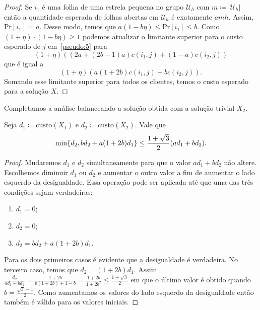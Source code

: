 \begin{proof}
    Se $i_1$ é uma folha de uma estrela pequena no grupo $\mathcal{U}_h$ com $m \coloneqq |\mathcal{U}_h|$ então a quantidade esperada de folhas abertas em $\mathcal{U}_h$ é exatamente $amh$. Assim, Pr$[i_1] = a$. Desse modo, temos que $a(1 - b\eta) \leq \text{Pr}[i_1] \leq b$. Como $(1+\eta)\cdot(1 - b\eta) \geq 1$ podemos atualizar o limitante superior para o custo esperado de $j$ em~\eqref{pseudo:5} para
    \begin{equation}
        (1 + \eta) ((2a + (2b - 1)a)c(i_1,j) + (1 - a) c(i_2,j)) \nonumber
    \end{equation}
    que é igual a 
    \begin{equation}
        (1 + \eta) (a (1 + 2b)c(i_1,j) + bc(i_2,j)) \nonumber.
    \end{equation}
    Somando esse limitante superior para todos os clientes, temos o custo esperado para a solução $X$.
\end{proof}

Completamos a análise balanceando a solução obtida com a solução trivial $X_2$.

\begin{lemma}
    Seja $d_1 \coloneqq \text{custo}(X_1)$ e $d_2 \coloneqq \text{custo}(X_2)$. Vale que \[\min\{d_2,bd_2 + a(1+2b)d_1\} \leq \frac{1 + \sqrt{3}}{2}(ad_1 + b d_2).\]
\end{lemma}

\begin{proof}
    Mudaremos $d_1$ e $d_2$ simultaneamente para que o valor $ad_1 + bd_2$ não altere. Escolhemos diminuir $d_1$ ou $d_2$ e aumentar o outro valor a fim de aumentar o lado esquerdo da desigualdade. Essa operação pode ser aplicada até que uma das três condições sejam verdadeiras:
    \begin{enumerate}
        \item $d_1 = 0$;
        \item $d_2 = 0$;
        \item $d_2 = bd_2 + a (1 + 2b)d_1$.
    \end{enumerate}

    Para os dois primeiros casos é evidente que a desigualdade é verdadeira. No terceiro caso, temos que $d_2 = (1 + 2b)d_1$. Assim 
    \(\frac{d_2}{ad_1 + bd_2} = \frac{1 +2b}{b(1+2b) + 1 - b} = \frac{1+2b}{1+2b^2} \leq \frac{1+\sqrt{3}}{2}\) em que o último valor é obtido quando $b = \frac{\sqrt{3} - 1}{2}$. Como aumentamos os valores do lado esquerdo da desigualdade então também é válido para os valores iniciais.
\end{proof}